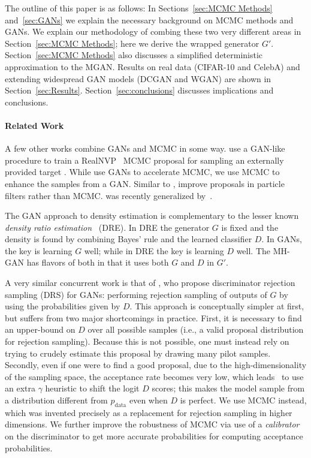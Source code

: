 \documentclass{article}
\newcommand{\target}{{p^\star}}
\newcommand{\PR}{{p_{\textrm{data}}}}
\begin{document}
The outline of this paper is as follows:
In Sections~\ref{sec:MCMC Methods} and~\ref{sec:GANs} we explain the necessary background on MCMC methods and GANs.
We explain our methodology of combing these two very different areas in Section~\ref{sec:MCMC Methods}; here we derive the wrapped generator $G'$.
Section~\ref{sec:MCMC Methods} also discusses a simplified deterministic approximation to the MGAN\@.
Results on real data (CIFAR-10 and CelebA) and extending widespread GAN models (DCGAN and WGAN) are shown in Section~\ref{sec:Results}.
Section~\ref{sec:conclusions} discusses implications and conclusions.

\paragraph{Related Work}
A few other works combine GANs and MCMC in some way.
\citet{Song2017} use a GAN-like procedure to train a RealNVP~\citep{Dinh2016} MCMC proposal for sampling an externally provided target \smash{$\target$}.
While \citet{Song2017} use GANs to accelerate MCMC, we use MCMC to enhance the samples from a GAN\@.
Similar to \cite{Song2017}, \citet{Kempinska2017} improve proposals in particle filters rather than MCMC\@.
\citet{Song2017} was recently generalized by~\citet{Neklyudov2018}.

The GAN approach to density estimation is complementary to the lesser known \emph{density ratio estimation}~\citep{Sugiyama2012} (DRE)\@.
In DRE the generator $G$ is fixed and the density is found by combining Bayes' rule and the learned classifier $D$.
In GANs, the key is learning $G$ well; while in DRE the key is learning $D$ well.
The MH-GAN has flavors of both in that it uses both $G$ and $D$ in $G'$.

A very similar concurrent work is that of \citet{Azadi2018}, who propose discriminator rejection sampling (DRS) for GANs: performing rejection sampling of outputs of $G$ by using the probabilities given by $D$.
This approach is conceptually simpler at first, but suffers from two major shortcomings in practice.
First, it is necessary to find an upper-bound on $D$ over all possible samples (i.e., a valid proposal distribution for rejection sampling)\@.
Because this is not possible, one must instead rely on trying to crudely estimate this proposal by drawing many pilot samples.
Secondly, even if one were to find a good proposal, due to the high-dimensionality of the sampling space, the acceptance rate becomes very low, which leads~\citet{Azadi2018} to use an extra $\gamma$ heuristic to shift the logit $D$ scores; this makes the model sample from a distribution different from $\PR$ even when $D$ is perfect. %
We use MCMC instead, which was invented precisely as a replacement for rejection sampling in higher dimensions. %
We further improve the robustness of MCMC via use of a \emph{calibrator} on the discriminator to get more accurate probabilities for computing acceptance probabilities.
\end{document}
